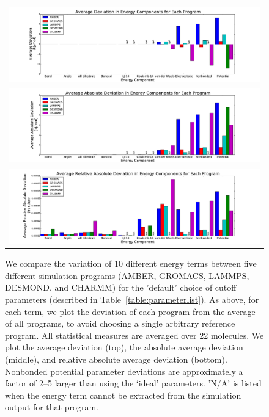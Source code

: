 \begin{figure}[h]
\begin{tabular}{c}
\includegraphics[width=\textwidth]{AverageDefaultSettings.pdf} \\  
\includegraphics[width=\textwidth]{AverageAbsoluteDefaultSettings.pdf} \\  
\includegraphics[width=\textwidth]{AverageRelativeAbsoluteDefaultSettings.pdf}
\end{tabular}
\caption{We compare the variation of 10 different energy terms between
  five different simulation programs (AMBER, GROMACS, LAMMPS, DESMOND,
  and CHARMM) for the 'default' choice of cutoff parameters (described
  in Table~\ref{table:parameterlist}). As above, for each term, we plot the deviation of each
  program from the average of all programs, to avoid choosing a single
  arbitrary reference program. All statistical measures are averaged over 22
  molecules. We plot the average deviation (top), the absolute average
  deviation (middle), and relative absolute average deviation
  (bottom). Nonbonded potential parameter deviations are approximately a
  factor of 2--5 larger than using the `ideal' parameters. 'N/A' is listed 
  when the energy term cannot be extracted
  from the simulation output for that program.
\label{fig:defaultfig}}
\end{figure}

